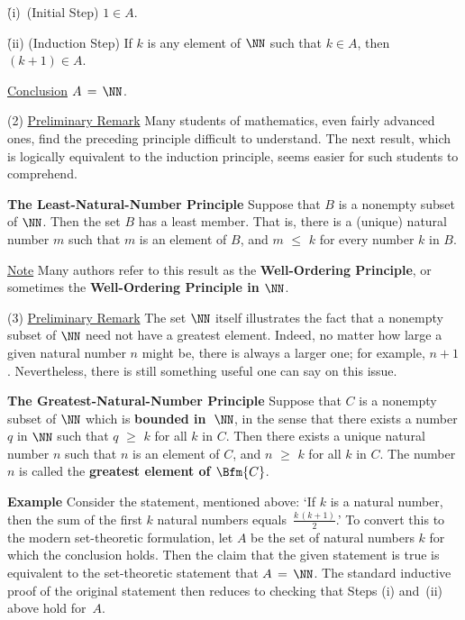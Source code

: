 {        \h (i)\, (Initial Step) $1{\in}A$.

        \h (ii) (Induction Step) If $k$ is any element of ${\NN}$ such that $k{\in}A$, then $(k+1){\in}A$.

\noindent \underline{Conclusion} $A \,=\, {\NN}$.

\V

        (2) \underline{Preliminary Remark} Many students of mathematics, even fairly advanced ones, find the preceding principle difficult to understand.
    The next result, which is logically equivalent to the induction principle, seems easier for such students to comprehend.

        \h {\bf The Least-Natural-Number Principle}
    Suppose that $B$ is a nonempty subset of ${\NN}$. Then the set $B$ has a least member.
    That is, there is a (unique) natural number $m$ such that $m$ is an element of $B$, and $m\,\,{\leq}\,\,k$ for every number $k$ in $B$.

        \underline{Note} Many authors refer to this result as the
    {\bf Well-Ordering Principle}, or sometimes the {\bf Well-Ordering Principle in ${\NN}$}.

\V

        (3) \underline{Preliminary Remark} The set ${\NN}$ itself illustrates the fact that a nonempty subset of ${\NN}$ need not have a greatest element.
    Indeed, no matter how large a given natural number $n$ might be, there is always a larger one; for example, $n+1$.
    Nevertheless, there is still something useful one can say on this issue.

        \h  {\bf The Greatest-Natural-Number Principle}
    Suppose that $C$ is a nonempty subset of ${\NN}$ which is {\bf bounded in~${\NN}$},
    in the sense that there exists a number $q$ in ${\NN}$ such that $q\,\,{\geq}\,\,k$ for all $k$ in $C$.
    Then there exists a unique natural number $n$ such that $n$ is an element of $C$, and $n\,\,{\geq}\,\,k$ for all $k$ in $C$.
    The number $n$ is called the {\bf greatest element of $\Bfm{C}$}.

\VV

        {\bf Example} Consider the statement, mentioned above:
    `If $k$ is a natural number, then the sum of the first $k$ natural numbers equals~${\displaystyle \frac{k\,(k+1)}{2}}$.'
    To convert this to the modern set-theoretic formulation, let $A$ be the set of natural numbers $k$ for which the conclusion holds.
    Then the claim that the given statement is true is equivalent to the set-theoretic statement that $A \,=\, {\NN}$.
    The standard inductive proof of the original statement then reduces to checking that Steps (i) and~(ii) above hold for~$A$.

}
